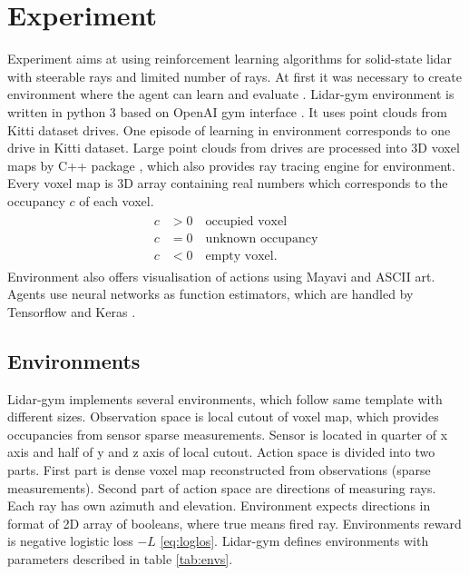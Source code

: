 \section{Experiment}
Experiment aims at using reinforcement learning algorithms for solid-state lidar with steerable rays and limited number of rays. At first it was necessary to create environment where the agent can learn and evaluate \cite{rozsypalek2018}. Lidar-gym environment is written in python 3 based on OpenAI gym interface \cite{openai2016}. It uses point clouds from Kitti dataset drives\cite{geiger2013}. One episode of learning in environment corresponds to one drive in Kitti dataset. Large point clouds from drives are processed into 3D voxel maps by C++ package \cite{petricek2017}, which also provides ray tracing engine for environment. Every voxel map is 3D array containing real numbers which corresponds to the occupancy $c$ of each voxel.
\begin{align}
\begin{split}
c &> 0 \quad \text{occupied voxel} \\
c &= 0 \quad \text{unknown occupancy} \\
c &< 0 \quad \text{empty voxel.}
\end{split}
\end{align}
Environment also offers visualisation of actions using Mayavi \cite{mayavi2011} and ASCII art. Agents use neural networks as function estimators, which are handled by Tensorflow \cite{tensorflow2015} and Keras \cite{keras2015}.

\subsection{Environments}
Lidar-gym implements several environments, which follow same template with different sizes. Observation space is local cutout of voxel map, which provides occupancies from sensor sparse measurements. Sensor is located in quarter of x axis and half of y and z axis of local cutout. Action space is divided into two parts. First part is dense voxel map reconstructed from observations (sparse measurements). Second part of action space are directions of measuring rays. Each ray has own azimuth and elevation. Environment expects directions in format of 2D array of booleans, where true means fired ray. Environments reward is negative logistic loss $-L$ \eqref{eq:loglos}. Lidar-gym defines environments with parameters described in table \ref{tab:envs}.

\renewcommand{\thefootnote}{\fnsymbol{footnote}}

